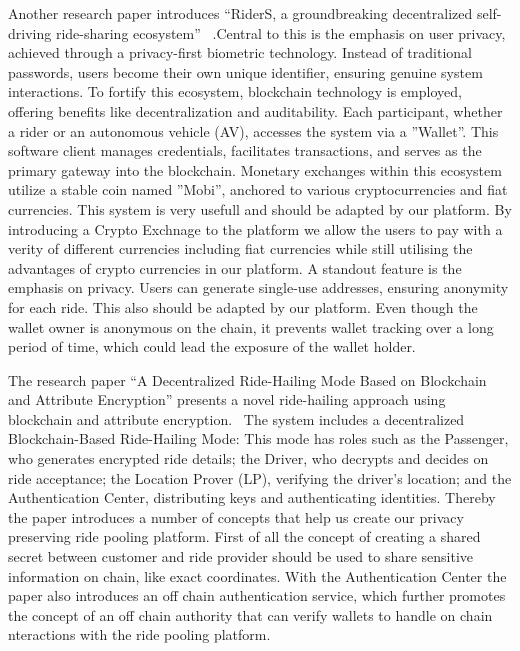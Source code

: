 Another research paper introduces ``RiderS, a groundbreaking decentralized self-driving ride-sharing ecosystem'' ~\cite{Bathen.}.Central to this is the emphasis on user privacy, achieved through a privacy-first biometric technology. Instead of traditional passwords, users become their own unique identifier, ensuring genuine system interactions. To fortify this ecosystem, blockchain technology is employed, offering benefits like decentralization and auditability. Each participant, whether a rider or an autonomous vehicle (AV), accesses the system via a ''Wallet''. This software client manages credentials, facilitates transactions, and serves as the primary gateway into the blockchain. Monetary exchanges within this ecosystem utilize a stable coin named ''Mobi'', anchored to various cryptocurrencies and fiat currencies. This system is very usefull and should be adapted by our platform. By introducing a Crypto Exchnage to the platform we allow the users to pay with a verity of different currencies including fiat currencies while still utilising the advantages of crypto currencies   in our platform. A standout feature is the emphasis on privacy. Users can generate single-use addresses, ensuring anonymity for each ride. This also should be adapted by our platform. Even though the wallet owner is anonymous on the chain, it prevents wallet tracking over a long period of time, which could lead the exposure of the wallet holder.

The research paper ``A Decentralized Ride-Hailing Mode Based on Blockchain and Attribute Encryption'' presents a novel ride-hailing approach using blockchain and attribute encryption.~\cite{Zhang.} 
The system includes a decentralized Blockchain-Based Ride-Hailing Mode: This mode has roles such as the Passenger, who generates encrypted ride details; the Driver, who decrypts and decides on ride acceptance; the Location Prover (LP), verifying the driver's location; and the Authentication Center, distributing keys and authenticating identities. Thereby the paper introduces a number of concepts that help us create our privacy preserving ride pooling platform. First of all the concept of creating a shared secret between customer and ride provider should be used  to share sensitive information on chain, like exact coordinates. With the  Authentication Center the paper also introduces an off chain authentication service, which further promotes the concept of an off chain authority that can verify  wallets to handle on chain nteractions with the ride pooling platform.

